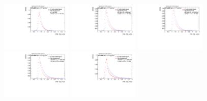 \begin{figure}
\bigskip
\includegraphics[width=0.3\textwidth]{sascha_input/Appendix/Distributions/higgs/distributions/beta05/h_assisted_tj_D2_05_bin1.pdf} \hspace{1mm}
\includegraphics[width=0.3\textwidth]{sascha_input/Appendix/Distributions/higgs/distributions/beta05/h_assisted_tj_D2_05_bin2.pdf} \hspace{4mm}
\includegraphics[width=0.3\textwidth]{sascha_input/Appendix/Distributions/higgs/distributions/beta05/h_assisted_tj_D2_05_bin3.pdf} 
\bigskip
\includegraphics[width=0.3\textwidth]{sascha_input/Appendix/Distributions/higgs/distributions/beta05/h_assisted_tj_D2_05_bin4.pdf} \hspace{4mm}
\includegraphics[width=0.3\textwidth]{sascha_input/Appendix/Distributions/higgs/distributions/beta05/h_assisted_tj_D2_05_bin5.pdf} 


\end{figure}
